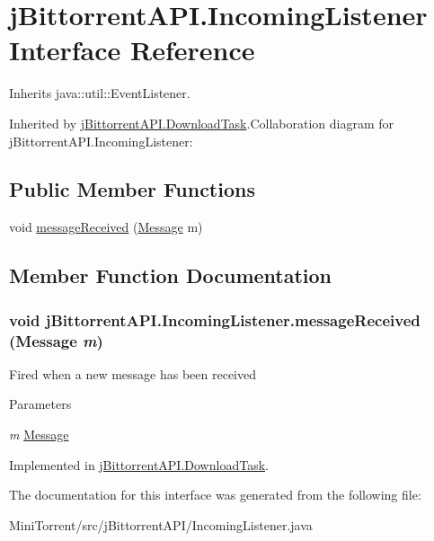 \hypertarget{interfacej_bittorrent_a_p_i_1_1_incoming_listener}{
\section{jBittorrentAPI.IncomingListener Interface Reference}
\label{interfacej_bittorrent_a_p_i_1_1_incoming_listener}
}


Inherits java::util::EventListener.

Inherited by \hyperlink{classj_bittorrent_a_p_i_1_1_download_task}{jBittorrentAPI.DownloadTask}.Collaboration diagram for jBittorrentAPI.IncomingListener:\subsection*{Public Member Functions}
\begin{DoxyCompactItemize}
\item 
void \hyperlink{interfacej_bittorrent_a_p_i_1_1_incoming_listener_a64813a5432e5379c8841f21f89c395a6}{messageReceived} (\hyperlink{classj_bittorrent_a_p_i_1_1_message}{Message} m)
\end{DoxyCompactItemize}


\subsection{Member Function Documentation}
\hypertarget{interfacej_bittorrent_a_p_i_1_1_incoming_listener_a64813a5432e5379c8841f21f89c395a6}{
\subsubsection[{messageReceived}]{\setlength{\rightskip}{0pt plus 5cm}void jBittorrentAPI.IncomingListener.messageReceived ({\bf Message} {\em m})}}
\label{interfacej_bittorrent_a_p_i_1_1_incoming_listener_a64813a5432e5379c8841f21f89c395a6}
Fired when a new message has been received 
\begin{DoxyParams}{Parameters}
\item[{\em m}]\hyperlink{classj_bittorrent_a_p_i_1_1_message}{Message} \end{DoxyParams}


Implemented in \hyperlink{classj_bittorrent_a_p_i_1_1_download_task_a3234c0677a09c13fdd7926e894db570d}{jBittorrentAPI.DownloadTask}.

The documentation for this interface was generated from the following file:\begin{DoxyCompactItemize}
\item 
MiniTorrent/src/jBittorrentAPI/IncomingListener.java\end{DoxyCompactItemize}
